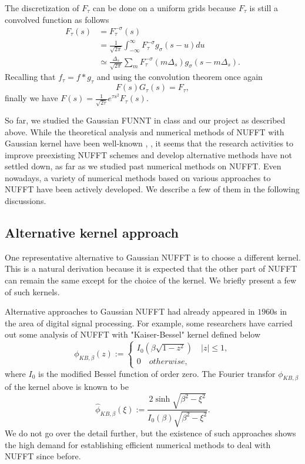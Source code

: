 The discretization of $F_{\tau}$ can be done on a uniform grids because $F_{\tau}$ is still a convolved function as follows
\begin{align}
     F_{\tau}(s)
  &= F_{\tau}^{-\sigma}(s) \\
  &= \frac{1}{\sqrt{2\pi}}\int_{-\infty}^{\infty}F_{\tau}^{-\sigma}g_{\sigma}(s-u)du \\
  &\simeq \frac{\Delta_{s}}{\sqrt{2\pi}}\sum_{m}^{}F_{\tau}^{-\sigma}(m\Delta_{s})
          g_{\sigma}(s - m\Delta_{s}).
\end{align}
Recalling that $f_{\tau} = f\ast g_{\tau}$ and using the convolution theorem once again
\begin{equation}
  F(s)G_{\tau}(s) = F_{\tau},
\end{equation}
finally we have $F(s) = \frac{1}{\sqrt{2\tau}}e^{\tau s^2}F_{\tau}(s)$.

So far, we studied the Gaussian FUNNT in class and our project as described above.
While the theoretical analysis and numerical methods of NUFFT with Gaussian kernel have been well-known \cite{SISC-1993-Dutt-Rokhlin}, \cite{SIAM-Rev-2004-Greengard}, it seems that the research activities to improve preexisting NUFFT schemes and develop alternative methods have not settled down, as far as we studied past numerical methods on NUFFT.
Even nowadays, a variety of numerical methods based on various approaches to NUFFT have been actively developed.
We describe a few of them in the following discussions.

\subsection{Alternative kernel approach}
One representative alternative to Gaussian NUFFT is to choose a different kernel.
This is a natural derivation because it is expected that the other part of NUFFT can remain the same except for the choice of the kernel.
We briefly present a few of such kernels.

Alternative approaches to Gaussian NUFFT had already appeared in $1960$s in the area of digital signal processing.
For example, some researchers have carried out some analysis of NUFFT with "Kaiser-Bessel" kernel \cite{Book-Kaiser} defined below
\begin{equation}
  \phi_{KB,\beta}(z) :=
  \begin{cases}
    I_{0}\left(\beta\sqrt{1-z^2}\right) \quad |z| \le 1,\\
    0 \quad otherwise,
  \end{cases}
  \label{eq:KB-kernel}
\end{equation}
where $I_{0}$ is the modified Bessel function of order zero.
The Fourier transfor $\phi_{KB,\beta}$ of the kernel above is known to be
\begin{equation}
  \hat{\phi}_{KB,\beta}(\xi) :=
  \frac{2\sinh\sqrt{\beta^2-\xi^2}}{I_{0}(\beta)\sqrt{\beta^2-\xi^2}}.
  \label{eq:FT-KB-kernel}
\end{equation}
We do not go over the detail further, but the existence of such approaches shows the high demand for establishing efficient numerical methods to deal with NUFFT since before.

